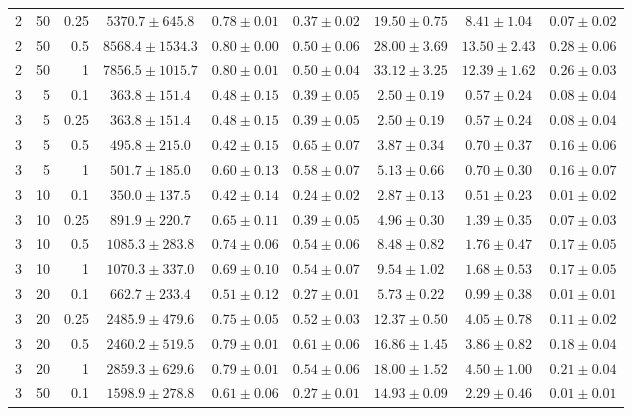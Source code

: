 \begin{table}[htbp]
\begin{tabular}{@{}rrrcccccc@{}}
2 & 50 & 0.25 & $5370.7 \pm 645.8$ & $0.78 \pm 0.01$ & $0.37 \pm 0.02$ & $19.50 \pm 0.75$ & $8.41 \pm 1.04$ & $0.07 \pm 0.02$ \\
2 & 50 & 0.5 & $8568.4 \pm 1534.3$ & $0.80 \pm 0.00$ & $0.50 \pm 0.06$ & $28.00 \pm 3.69$ & $13.50 \pm 2.43$ & $0.28 \pm 0.06$ \\
2 & 50 & 1 & $7856.5 \pm 1015.7$ & $0.80 \pm 0.01$ & $0.50 \pm 0.04$ & $33.12 \pm 3.25$ & $12.39 \pm 1.62$ & $0.26 \pm 0.03$ \\
\midrule
3 & 5 & 0.1 & $363.8 \pm 151.4$ & $0.48 \pm 0.15$ & $0.39 \pm 0.05$ & $2.50 \pm 0.19$ & $0.57 \pm 0.24$ & $0.08 \pm 0.04$ \\
3 & 5 & 0.25 & $363.8 \pm 151.4$ & $0.48 \pm 0.15$ & $0.39 \pm 0.05$ & $2.50 \pm 0.19$ & $0.57 \pm 0.24$ & $0.08 \pm 0.04$ \\
3 & 5 & 0.5 & $495.8 \pm 215.0$ & $0.42 \pm 0.15$ & $0.65 \pm 0.07$ & $3.87 \pm 0.34$ & $0.70 \pm 0.37$ & $0.16 \pm 0.06$ \\
3 & 5 & 1 & $501.7 \pm 185.0$ & $0.60 \pm 0.13$ & $0.58 \pm 0.07$ & $5.13 \pm 0.66$ & $0.70 \pm 0.30$ & $0.16 \pm 0.07$ \\
3 & 10 & 0.1 & $350.0 \pm 137.5$ & $0.42 \pm 0.14$ & $0.24 \pm 0.02$ & $2.87 \pm 0.13$ & $0.51 \pm 0.23$ & $0.01 \pm 0.02$ \\
3 & 10 & 0.25 & $891.9 \pm 220.7$ & $0.65 \pm 0.11$ & $0.39 \pm 0.05$ & $4.96 \pm 0.30$ & $1.39 \pm 0.35$ & $0.07 \pm 0.03$ \\
3 & 10 & 0.5 & $1085.3 \pm 283.8$ & $0.74 \pm 0.06$ & $0.54 \pm 0.06$ & $8.48 \pm 0.82$ & $1.76 \pm 0.47$ & $0.17 \pm 0.05$ \\
3 & 10 & 1 & $1070.3 \pm 337.0$ & $0.69 \pm 0.10$ & $0.54 \pm 0.07$ & $9.54 \pm 1.02$ & $1.68 \pm 0.53$ & $0.17 \pm 0.05$ \\
3 & 20 & 0.1 & $662.7 \pm 233.4$ & $0.51 \pm 0.12$ & $0.27 \pm 0.01$ & $5.73 \pm 0.22$ & $0.99 \pm 0.38$ & $0.01 \pm 0.01$ \\
3 & 20 & 0.25 & $2485.9 \pm 479.6$ & $0.75 \pm 0.05$ & $0.52 \pm 0.03$ & $12.37 \pm 0.50$ & $4.05 \pm 0.78$ & $0.11 \pm 0.02$ \\
3 & 20 & 0.5 & $2460.2 \pm 519.5$ & $0.79 \pm 0.01$ & $0.61 \pm 0.06$ & $16.86 \pm 1.45$ & $3.86 \pm 0.82$ & $0.18 \pm 0.04$ \\
3 & 20 & 1 & $2859.3 \pm 629.6$ & $0.79 \pm 0.01$ & $0.54 \pm 0.06$ & $18.00 \pm 1.52$ & $4.50 \pm 1.00$ & $0.21 \pm 0.04$ \\
3 & 50 & 0.1 & $1598.9 \pm 278.8$ & $0.61 \pm 0.06$ & $0.27 \pm 0.01$ & $14.93 \pm 0.09$ & $2.29 \pm 0.46$ & $0.01 \pm 0.01$ \\

\end{tabular}
\end{table}
